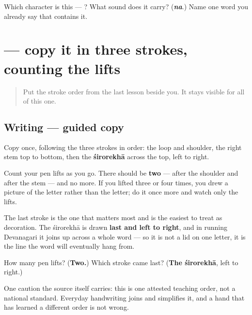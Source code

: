 \begin{tcolorbox}[breakable,colback=teal!4,colframe=teal!35!black,title={Before you move on}]
Which character is this — ? What sound does it carry? (\emph{\textbf{na}}.) Name one word you already say that contains it.
\end{tcolorbox}
\section[\texorpdfstring{\sk{न} (na)}{न (na)}]{ — copy it in three strokes, counting the lifts}

\label{lesson:SA-S02-copy-the-three-strokes}



\begin{quote}
Put the stroke order from the last lesson beside you. It stays visible for all of this one.
\end{quote}

\subsection*{Writing — guided copy}

Copy \textbf{} once, following the three strokes in order: the loop and shoulder, the right stem top to bottom, then the \textbf{śirorekhā} across the top, left to right.

Count your pen lifts as you go. There should be \textbf{two} — after the shoulder and after the stem — and no more. If you lifted three or four times, you drew a picture of the letter rather than the letter; do it once more and watch only the lifts.

The last stroke is the one that matters most and is the easiest to treat as decoration. The śirorekhā is drawn \textbf{last and left to right}, and in running Devanagari it joins up across a whole word — so it is not a lid on one letter, it is the line the word will eventually hang from.

\begin{tcolorbox}[breakable,colback=teal!4,colframe=teal!35!black,title={Before you move on}]
How many pen lifts? (\textbf{Two.}) Which stroke came last? (\textbf{The śirorekhā}, left to right.)

One caution the source itself carries: this is one attested teaching order, not a national standard. Everyday handwriting joins and simplifies it, and a hand that has learned a different order is not wrong.
\end{tcolorbox}
